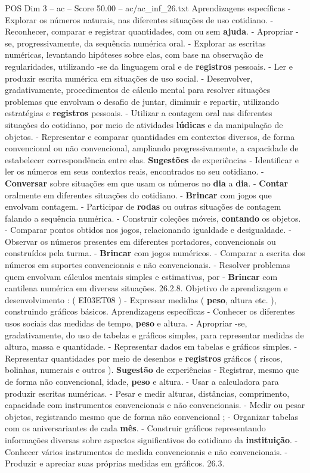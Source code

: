 \begin{textsample}{POS Dim 3 – ac – Score 50.00 – ac/ac\_inf\_26.txt}
Aprendizagens específicas - Explorar os números naturais, nas diferentes situações de uso cotidiano. - Reconhecer, comparar e registrar quantidades, com ou sem \textbf{ajuda}. - Apropriar -se, progressivamente, da sequência numérica oral. - Explorar as escritas numéricas, levantando hipóteses sobre elas, com base na observação de regularidades, utilizando -se da linguagem oral e de \textbf{registros} pessoais. - Ler e produzir escrita numérica em situações de uso social. - Desenvolver, gradativamente, procedimentos de cálculo mental para resolver situações problemas que envolvam o desafio de juntar, diminuir e repartir, utilizando estratégias e \textbf{registros} pessoais. - Utilizar a contagem oral nas diferentes situações do cotidiano, por meio de atividades \textbf{lúdicas} e da manipulação de objetos. - Representar e comparar quantidades em contextos diversos, de forma convencional ou não convencional, ampliando progressivamente, a capacidade de estabelecer correspondência entre elas. \textbf{Sugestões} de experiências - Identificar e ler os números em seus contextos reais, encontrados no seu cotidiano. - \textbf{Conversar} sobre situações em que usam os números no \textbf{dia} a \textbf{dia}. - \textbf{Contar} oralmente em diferentes situações do cotidiano. - \textbf{Brincar} com jogos que envolvam contagem. - Participar de \textbf{rodas} ou outras situações de contagem falando a sequência numérica. - Construir coleções móveis, \textbf{contando} os objetos. - Comparar pontos obtidos nos jogos, relacionando igualdade e desigualdade. - Observar os números presentes em diferentes portadores, convencionais ou construídos pela turma. - \textbf{Brincar} com jogos numéricos. - Comparar a escrita dos números em suportes convencionais e não convencionais. - Resolver problemas quem envolvam cálculos mentais simples e estimativas, por - \textbf{Brincar} com cantilena numérica em diversas situações. 26.2.8.
Objetivo de aprendizagem e desenvolvimento : ( EI03ET08 ) - Expressar medidas ( \textbf{peso}, altura etc. ), construindo gráficos básicos.
Aprendizagens específicas - Conhecer os diferentes usos sociais das medidas de tempo, \textbf{peso} e altura. - Apropriar -se, gradativamente, do uso de tabelas e gráficos simples, para representar medidas de altura, massa e quantidade. - Representar dados em tabelas e gráficos simples. - Representar quantidades por meio de desenhos e \textbf{registros} gráficos ( riscos, bolinhas, numerais e outros ). \textbf{Sugestão} de experiências - Registrar, mesmo que de forma não convencional, idade, \textbf{peso} e altura. - Usar a calculadora para produzir escritas numéricas. - Pesar e medir alturas, distâncias, comprimento, capacidade com instrumentos convencionais e não convencionais. - Medir ou pesar objetos, registrando mesmo que de forma não convencional ; - Organizar tabelas com os aniversariantes de cada \textbf{mês}. - Construir gráficos representando informações diversas sobre aspectos significativos do cotidiano da \textbf{instituição}. - Conhecer vários instrumentos de medida convencionais e não convencionais. - Produzir e apreciar suas próprias medidas em gráficos. 26.3.

\end{textsample}
